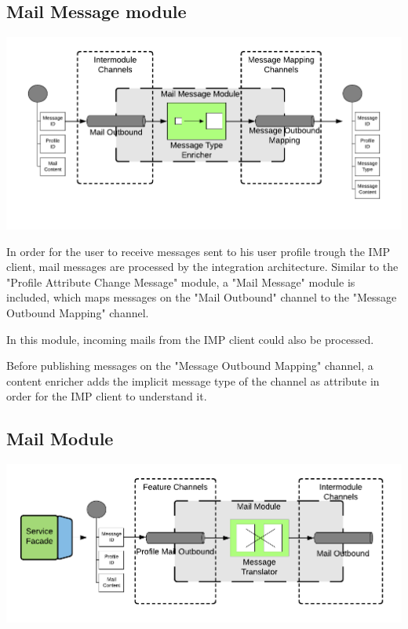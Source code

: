 \subsection{Mail Message module}

\begin{center}
    \includegraphics[scale=0.6]{Diagrams/Integration Architecture 1/Technological Integration/14. Mail Message Module.pdf}
\end{center}

In order for the user to receive messages sent to his user profile trough the IMP client, mail messages are processed by the integration architecture. Similar to the "Profile Attribute Change Message" module, a "Mail Message" module is included, which maps messages on the "Mail Outbound" channel to the "Message Outbound Mapping" channel.

In this module, incoming mails from the IMP client could also be processed.

Before publishing messages on the "Message Outbound Mapping" channel, a content enricher adds the implicit message type of the channel as attribute in order for the IMP client to understand it. 

\subsection{Mail Module}

\begin{center}
    \includegraphics[scale=0.6]{Diagrams/Integration Architecture 1/Technological Integration/15. Mail Module.pdf}
\end{center}

